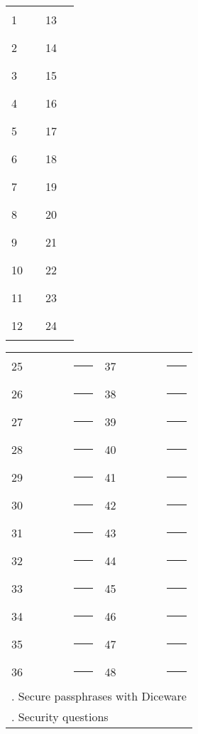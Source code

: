 \newpage

\newcommand{\myrule}{
	\rule{2in}{.2pt}
}
\newcommand{\myrulespace}{
	\vspace{.3125in}
}

\begin{center}
{
	\large
	\textbf{}
}
\vspace{.5in}

\begin{tabular}{l l l l }
	 1 & \myrule & 13 & \myrule \myrulespace \\
	 2 & \myrule & 14 & \myrule \myrulespace \\
	 3 & \myrule & 15 & \myrule \myrulespace \\
	 4 & \myrule & 16 & \myrule \myrulespace \\
	 5 & \myrule & 17 & \myrule \myrulespace \\
	 6 & \myrule & 18 & \myrule \myrulespace \\
	 7 & \myrule & 19 & \myrule \myrulespace \\
	 8 & \myrule & 20 & \myrule \myrulespace \\
	 9 & \myrule & 21 & \myrule \myrulespace \\
	10 & \myrule & 22 & \myrule \myrulespace \\
	11 & \myrule & 23 & \myrule \myrulespace \\
	12 & \myrule & 24 & \myrule \myrulespace \\
\end{tabular}

\end{center}

\newpage

\begin{center}
	
\begin{tabular}{l l l l }
	25 & \myrule & 37 & \myrule \myrulespace \\
	26 & \myrule & 38 & \myrule \myrulespace \\
	27 & \myrule & 39 & \myrule \myrulespace \\
	28 & \myrule & 40 & \myrule \myrulespace \\
	29 & \myrule & 41 & \myrule \myrulespace \\
	30 & \myrule & 42 & \myrule \myrulespace \\
	31 & \myrule & 43 & \myrule \myrulespace \\
	32 & \myrule & 44 & \myrule \myrulespace \\
	33 & \myrule & 45 & \myrule \myrulespace \\
	34 & \myrule & 46 & \myrule \myrulespace \\
	35 & \myrule & 47 & \myrule \myrulespace \\
	36 & \myrule & 48 & \myrule \myrulespace \\
	\multicolumn{4}{l}{\pageref{ch:diceware}. Secure passphrases with Diceware} \vspace{.3in} \\
	\multicolumn{4}{l}{\pageref{ch:qna}. Security questions} \\
\end{tabular}
	
\end{center}
